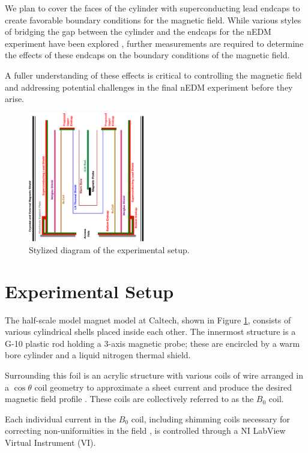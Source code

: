 \documentclass[twocolumn,aps,prb,citeautoscript]{revtex4-1}
\begin{document}
We plan to cover the faces of the cylinder with superconducting lead endcaps
to create favorable boundary conditions for the magnetic field.
While various styles of bridging the gap between the cylinder and the endcaps
for the nEDM experiment have
been explored \cite{endcapstyles}, further measurements are required to
determine the effects of these endcaps on the boundary conditions of
the magnetic field.

A fuller understanding of these effects is critical to
controlling the magnetic field and addressing potential challenges in the
final nEDM experiment before they arise. 

\begin{figure}
\includegraphics[width=0.45\textwidth]{out.eps}
\caption{\label{fig:structure}Stylized diagram of the experimental
setup.}
\end{figure}

\section{Experimental Setup}

The half-scale model magnet model at Caltech, shown in
Figure \ref{fig:structure}, consists of various
cylindrical
shells placed inside each other. The innermost structure is 
a G-10 plastic rod holding a 3-axis magnetic probe; these are encircled by a
warm bore cylinder and a liquid nitrogen thermal shield.

Surrounding this foil is
an acrylic structure with various coils of wire arranged in a $\cos\theta$ coil
geometry
to approximate a sheet current and produce the desired magnetic field
profile \cite{coil}.
These coils are collectively referred
to as the $B_0$ coil.

Each individual current in the $B_0$ coil, including shimming coils
necessary for correcting non-uniformities in the field \cite{coil}, is
controlled through a NI LabView Virtual Instrument (VI).
\end{document}
